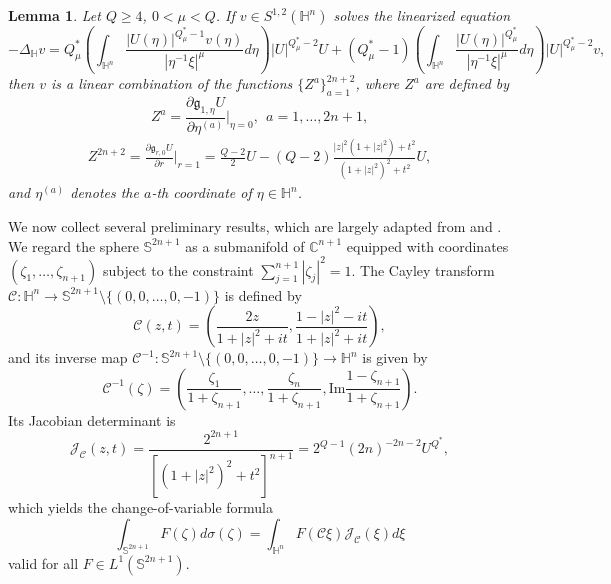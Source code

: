 \documentclass[11pt]{article}
\newtheorem{lemma}{Lemma}[section]
\begin{document}
\begin{lemma}
 Let $Q\geq 4$, $0<\mu< Q$.
 {If $v \in S^{1,2}(\mathbb{H}^{n})$ solves the linearized equation}
 \begin{equation*}
 -\Delta_{\mathbb{H}} v=Q^{\ast}_{\mu}\left(\int_{\mathbb{H}^{n}}\frac{|U(\eta)|^{Q^{\ast}_{\mu}-1}v(\eta)}
{|\eta^{-1}\xi|^{\mu}}{d}\eta\right)|U|^{Q^{\ast}_{\mu}-2}U+(Q^{\ast}_{\mu}-1)
\left(\int_{\mathbb{H}^{n}}\frac{|U(\eta)|^{Q^{\ast}_{\mu}}}{|\eta^{-1}\xi|^{\mu}}{d}\eta\right)
|U|^{Q^{\ast}_{\mu}-2}v,
\end{equation*}
{then $v$ is a linear combination} of the functions $\{Z^{a}\}_{a=1}^{2n +2}$, where $Z^a$ are defined by
 \begin{equation*}
 Z^{a}=\frac{\partial \mathfrak{g}_{1, \eta}U }{\partial\eta^{(a)}}\bigg|_{ \eta=0},~~ a=1,\ldots, 2n+1,
 \end{equation*}
\begin{equation*}
\begin{aligned}
Z^{2n+2}= \frac{\partial \mathfrak{g}_{r, 0}U }{\partial r}\bigg|_{r=1}=
\frac{Q-2}{2}U-(Q-2)\frac{|z|^2(1+|z|^2)+t^2}{(1+|z|^2)^2+t^2} U,
\end{aligned}
\end{equation*}
and $\eta^{(a)}$ denotes the $a$-th coordinate of $\eta \in \mathbb{H}^n$.
\end{lemma}

We now collect several preliminary results, which are largely adapted from \cite[Section 5]{FL12} and \cite[Section 2]{YZ251}.
We regard the sphere $\mathbb{S}^{2n+1}$ as a submanifold of $\mathbb{C}^{n+1}$ equipped with coordinates
$(\zeta_1,\ldots,\zeta_{n+1})$ subject to the constraint $\sum\limits_{j=1}^{n+1}|\zeta_j|^2=1$.
 The Cayley transform $\mathcal{C}:\mathbb{H}^n \rightarrow \mathbb{S}^{2n+1}\setminus \{(0,0,\ldots,0,-1)\}$ is defined by
\begin{equation*}
 \mathcal{C}(z,t)=\left(\frac{2z}{1+|z|^2+it},\frac{1-|z|^2-it}{1+|z|^2+it}\right),
\end{equation*}
and its inverse map $\mathcal{C}^{-1}: \mathbb{S}^{2n+1}\setminus \{(0,0,\ldots,0,-1)\}\rightarrow \mathbb{H}^n$ is given by
\begin{equation*}
 \mathcal{C}^{-1}(\zeta)=\left(\frac{\zeta_1}{1+\zeta_{n+1}},\ldots,\frac{\zeta_n}{1+\zeta_{n+1}},\mathrm{Im}\frac{1-\zeta_{n+1}}{1+\zeta_{n+1}}\right).
\end{equation*}
{Its Jacobian determinant is}
\begin{equation*}
 \mathcal{J}_\mathcal{C}(z,t)=\frac{2^{2n+1}}{[(1+|z|^2)^2+t^2]^{n+1}}=2^{Q-1}(2n)^{-2n-2}U^{Q^{\ast}},
\end{equation*}
which yields the change-of-variable formula \[\int_{\mathbb{S}^{2n+1}}F(\zeta)d \sigma(\zeta)=\int_{\mathbb{H}^n}F(\mathcal{C}\xi) \mathcal{J}_\mathcal{C}(\xi) d \xi\]
valid for all $F\in L^1(\mathbb{S}^{2n+1})$.
\end{document}
